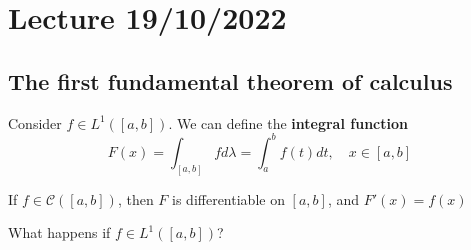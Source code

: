 \section{Lecture 19/10/2022}
\subsection*{The first fundamental theorem of calculus}

Consider \(f \in L^1\left([a,b]\right)\). We can define the \textbf{integral function}
\[F(x) = \int_{[a,b]} f d\lambda = \int_a^b f(t)dt , \quad x \in [a,b]\]

If \(f \in \mathcal{C}\left(\left[a, b\right]\right)\), then \(F\) is differentiable on \(\left[a, b\right]\), and \(F'(x)=f(x)\)

What happens if \(f \in L^1([a, b])\)?



